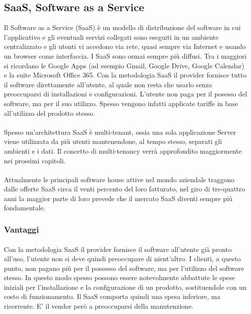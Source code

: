 \subsection{SaaS, Software as a Service}

Il Software as a Service (SaaS) è un modello di distribuzione del software in cui l’applicativo e gli eventuali servizi collegati sono eseguiti in un ambiente centralizzato e gli utenti vi accedono via rete, quasi sempre via Internet e usando un browser come interfaccia. I SaaS sono ormai sempre più diffusi. Tra i maggiori si ricordano le Google Apps (ad esempio Gmail, Google Drive, Google Calendar) e la suite Microsoft Office 365. Con la metodologia SaaS il provider fornisce tutto il software direttamente all'utente, al quale non resta che usarlo senza preoccuparsi di installazioni e configurazioni. L'utente non paga per il posesso del software, ma per il suo utilizzo. Spesso vengono infatti applicate tariffe in base all'utilizzo del prodotto stesso. 

\paragraph{}
Spesso un'architettura SaaS è multi-tenant, ossia una sola applicazione Server viene utilizzata da più utenti mantenendone, al tempo stesso, separati gli ambienti e i dati. Il concetto di multi-tenancy verrà approfondito maggiormente nei prossimi capitoli.
\paragraph{}
Attualmente le principali software house attive nel mondo aziendale traggono dalle offerte SaaS circa il venti percento del loro fatturato, nel giro di tre-quattro anni la maggior parte di loro prevede che il mercato SaaS diventi sempre più fondamentale.
\subsubsection{Vantaggi}
\paragraph{}
Con la metodologia SaaS il provider fornisce il software all'utente già pronto all'uso, l'utente non si deve quindi preoccupare di nient'altro. I clienti, a questo punto, non pagano più per il possesso del software, ma per l'utilizzo del software stesso. In questo modo spesso possono essere notevolmente abbattute le spese iniziali per l'installazione e la configurazione di un prodotto, sostituendole con un costo di funzionamento. Il SaaS comporta quindi una spesa inferiore, ma ricorrente. E' il vendor però a preoccuparsi della manutenzione.
